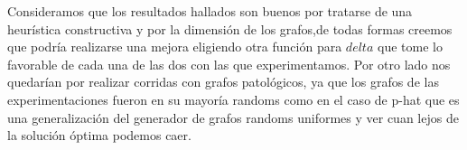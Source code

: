 Consideramos que los resultados hallados son buenos por tratarse de una heurística constructiva y por la dimensión de los grafos,de todas formas creemos que podría realizarse una mejora eligiendo otra función para $delta$ que tome lo favorable de cada una de las dos con las que experimentamos. 
Por otro lado nos quedarían por realizar corridas con grafos patológicos, ya que los grafos de las experimentaciones fueron en su mayoría randoms como en el caso de p-hat que es una generalización del generador de grafos randoms uniformes y ver cuan lejos de la solución óptima podemos caer.

